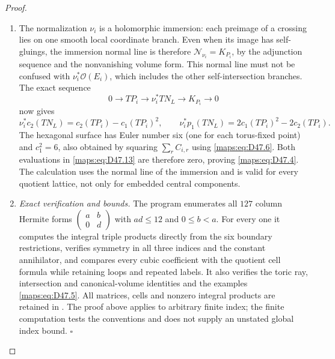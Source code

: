 \begin{proof}
\begin{enumerate}[label=\arabic*.,leftmargin=*]
\item The normalization $\nu_i$ is a holomorphic immersion:
each preimage of a crossing lies on one smooth local
coordinate branch. Even when its image has self-gluings,
the immersion normal line is therefore
$\mathcal N_{\nu_i}=K_{P_i}$, by the adjunction sequence
and the nonvanishing volume form. This normal line
must not be confused with $\nu_i^*\mathcal O(E_i)$,
which includes the other self-intersection branches.
The exact sequence
\[
       0\longrightarrow TP_i\longrightarrow\nu_i^*TN_L
                        \longrightarrow K_{P_i}\longrightarrow0
                                                               \tag{D47.12}\label{maps:eq:D47.12}
\]
now gives
\[
 \nu_i^*c_2(TN_L)=c_2(TP_i)-c_1(TP_i)^2,\qquad
 \nu_i^*p_1(TN_L)=2c_1(TP_i)^2-2c_2(TP_i).                 \tag{D47.13}\label{maps:eq:D47.13}
\]
The hexagonal surface has Euler number six (one for
each torus-fixed point) and $c_1^2=6$, also obtained
by squaring $\sum_rC_{i,r}$ using \eqref{maps:eq:D47.6}.
Both evaluations in \eqref{maps:eq:D47.13} are therefore zero,
proving \eqref{maps:eq:D47.4}. The calculation uses the normal line
of the immersion and is valid for every quotient
lattice, not only for embedded central components.

\item \emph{Exact verification and bounds.}
The program
enumerates all $127$ column Hermite forms
$\left(\begin{smallmatrix}a&b\\0&d\end{smallmatrix}\right)$
with $ad\le12$ and $0\le b<a$. For every one it
computes the integral triple products directly from
the six boundary restrictions, verifies symmetry
in all three indices and the constant annihilator,
and compares every cubic coefficient with the
quotient cell formula while retaining loops and
repeated labels. It also verifies the toric ray,
intersection and canonical-volume identities and
the examples \eqref{maps:eq:D47.5}. All matrices, cells and
nonzero integral products are retained in
.
The proof above applies to arbitrary finite index;
the finite computation tests the conventions and
does not supply an unstated global index bound.
\hfill$\square$
\end{enumerate}
\end{proof}


